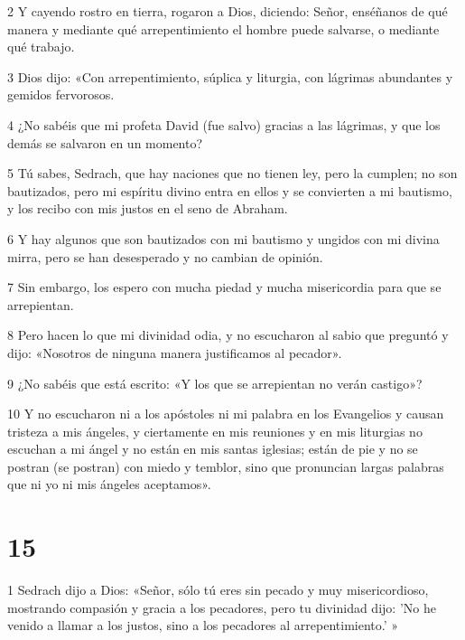 \par 2 Y cayendo rostro en tierra, rogaron a Dios, diciendo: Señor, enséñanos de qué manera y mediante qué arrepentimiento el hombre puede salvarse, o mediante qué trabajo.

\par 3 Dios dijo: «Con arrepentimiento, súplica y liturgia, con lágrimas abundantes y gemidos fervorosos.

\par 4 ¿No sabéis que mi profeta David (fue salvo) gracias a las lágrimas, y que los demás se salvaron en un momento?

\par 5 Tú sabes, Sedrach, que hay naciones que no tienen ley, pero la cumplen; no son bautizados, pero mi espíritu divino entra en ellos y se convierten a mi bautismo, y los recibo con mis justos en el seno de Abraham.

\par 6 Y hay algunos que son bautizados con mi bautismo y ungidos con mi divina mirra, pero se han desesperado y no cambian de opinión.

\par 7 Sin embargo, los espero con mucha piedad y mucha misericordia para que se arrepientan.

\par 8 Pero hacen lo que mi divinidad odia, y no escucharon al sabio que preguntó y dijo: «Nosotros de ninguna manera justificamos al pecador».

\par 9 ¿No sabéis que está escrito: «Y los que se arrepientan no verán castigo»?

\par 10 Y no escucharon ni a los apóstoles ni mi palabra en los Evangelios y causan tristeza a mis ángeles, y ciertamente en mis reuniones y en mis liturgias no escuchan a mi ángel y no están en mis santas iglesias; están de pie y no se postran (se postran) con miedo y temblor, sino que pronuncian largas palabras que ni yo ni mis ángeles aceptamos».

\chapter{15}

\par 1 Sedrach dijo a Dios: «Señor, sólo tú eres sin pecado y muy misericordioso, mostrando compasión y gracia a los pecadores, pero tu divinidad dijo: 'No he venido a llamar a los justos, sino a los pecadores al arrepentimiento.' »

